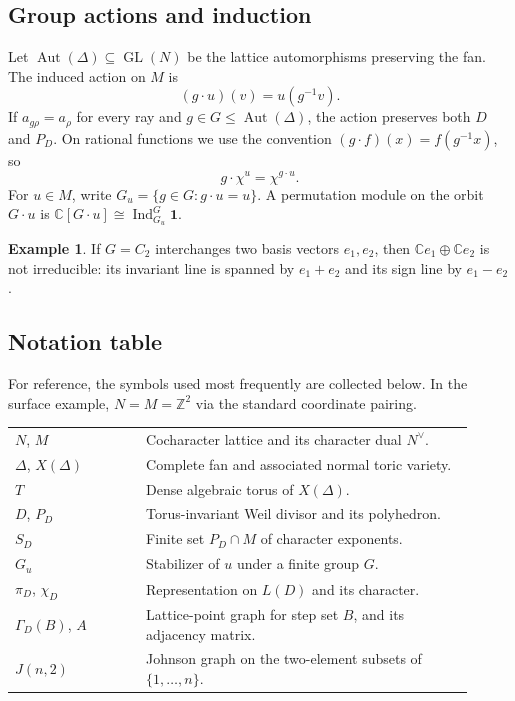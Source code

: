 \documentclass[12pt,letterpaper]{article}
\theoremstyle{definition}
\newtheorem{example}[theorem]{Example}
\theoremstyle{remark}
\numberwithin{equation}{section}
\DeclareMathOperator{\Aut}{Aut}
\DeclareMathOperator{\Ind}{Ind}
\newcommand{\CC}{\mathbb C}
\newcommand{\ZZ}{\mathbb Z}
\newcommand{\bfone}{\mathbf 1}
\begin{document}
\subsection{Group actions and induction}
Let $\Aut(\Delta)\subseteq\operatorname{GL}(N)$ be the lattice automorphisms preserving the fan. The induced action on $M$ is
\begin{equation}\label{eq:dualaction}
(g\cdot u)(v)=u(g^{-1}v).
\end{equation}
If $a_{g\rho}=a_\rho$ for every ray and $g\in G\leq\Aut(\Delta)$, the action preserves both $D$ and $P_D$. On rational functions we use the convention $(g\cdot f)(x)=f(g^{-1}x)$, so
\begin{equation}\label{eq:monomialaction}
g\cdot\chi^u=\chi^{g\cdot u}.
\end{equation}
For $u\in M$, write $G_u=\{g\in G:g\cdot u=u\}$. A permutation module on the orbit $G\cdot u$ is $\CC[G\cdot u]\cong\Ind_{G_u}^G\bfone$.

\begin{example}
If $G=C_2$ interchanges two basis vectors $e_1,e_2$, then $\CC e_1\oplus\CC e_2$ is not irreducible: its invariant line is spanned by $e_1+e_2$ and its sign line by $e_1-e_2$.
\end{example}

\subsection{Notation table}
For reference, the symbols used most frequently are collected below. In the surface example, $N=M=\ZZ^2$ via the standard coordinate pairing.
\begin{center}
\begin{tabular}{@{}p{0.26\linewidth}p{0.65\linewidth}@{}}
\toprule
$N$, $M$ & Cocharacter lattice and its character dual $N^\vee$.\\
$\Delta$, $X(\Delta)$ & Complete fan and associated normal toric variety.\\
$T$ & Dense algebraic torus of $X(\Delta)$.\\
$D$, $P_D$ & Torus-invariant Weil divisor and its polyhedron.\\
$S_D$ & Finite set $P_D\cap M$ of character exponents.\\
$G_u$ & Stabilizer of $u$ under a finite group $G$.\\
$\pi_D$, $\chi_D$ & Representation on $L(D)$ and its character.\\
$\Gamma_D(B)$, $A$ & Lattice-point graph for step set $B$, and its adjacency matrix.\\
$J(n,2)$ & Johnson graph on the two-element subsets of $\{1,\ldots,n\}$.\\
\bottomrule
\end{tabular}
\end{center}
\end{document}
